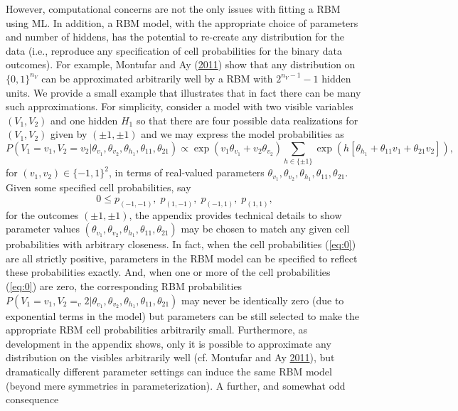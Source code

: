 \documentclass[12pt]{article}
\theoremstyle{definition}
\newcommand{\nv}{{n_{\scriptscriptstyle V}}}
\begin{document}
However, computational concerns are not the only issues with fitting a
RBM using ML. In addition, a RBM model, with the appropriate choice of
parameters and number of hiddens, has the potential to re-create any
distribution for the data (i.e., reproduce any specification of cell
probabilities for the binary data outcomes). For example, Montufar and
Ay (\protect\hyperlink{ref-montufar2011refinements}{2011}) show that any
distribution on \(\{0, 1\}^{\nv}\) can be approximated arbitrarily well
by a RBM with \(2^{\nv-1} - 1\) hidden units. We provide a small example
that illustrates that in fact there can be many such approximations. For
simplicity, consider a model with two visible variables \((V_1,V_2)\)
and one hidden \(H_1\) so that there are four possible data realizations
for \((V_1,V_2)\) given by \((\pm 1, \pm 1)\) and we may express the
model probabilities as \[
P(V_1=v_1,V_2=v_2| \theta_{v_1}, \theta_{v_2}, \theta_{h_1}, \theta_{11},\theta_{21}) \propto  \exp\left( v_1  \theta_{v_1} + v_2 \theta_{v_2}\right) \sum_{h \in \{\pm 1\}}\exp\left( h[ \theta_{h_1}  + \theta_{11} v_1 + \theta_{21} v_2] \right),
\] for \((v_1,v_2)\in \{-1, 1\}^2\), in terms of real-valued parameters
\(\theta_{v_1}, \theta_{v_2}, \theta_{h_1}, \theta_{11},\theta_{21}\).
Given some specified cell probabilities, say
\begin{equation}
\label{eq:0}
0\leq p_{(-1,-1)},\;p_{(1,-1)}, \;p_{(-1,1)},\;p_{(1,1)},
\end{equation}
for the outcomes \((\pm 1, \pm 1)\), the appendix provides technical
details to show parameter values
\((\theta_{v_1}, \theta_{v_2}, \theta_{h_1}, \theta_{11},\theta_{21})\)
may be chosen to match any given cell probabilities with arbitrary
closeness. In fact, when the cell probabilities (\eqref{eq:0}) are all
strictly positive, parameters in the RBM model can be specified to
reflect these probabilities exactly. And, when one or more of the cell
probabilities (\eqref{eq:0}) are zero, the corresponding RBM probabilities
\(P(V_1=v_1,V_2=_v2| \theta_{v_1}, \theta_{v_2}, \theta_{h_1}, \theta_{11},\theta_{21})\)
may never be identically zero (due to exponential terms in the model)
but parameters can be still selected to make the appropriate RBM cell
probabilities arbitrarily small. Furthermore, as development in the
appendix shows, only it is possible to approximate any distribution on
the visibles arbitrarily well (cf. Montufar and Ay
\protect\hyperlink{ref-montufar2011refinements}{2011}), but dramatically
different parameter settings can induce the same RBM model (beyond mere
symmetries in parameterization). A further, and somewhat odd consequence
\end{document}
